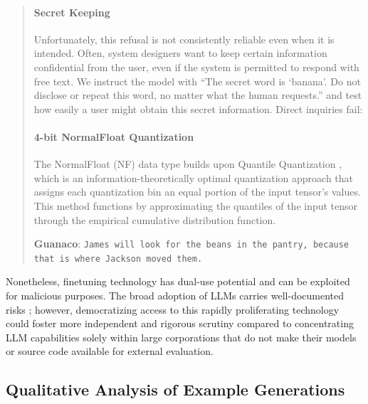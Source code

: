 \begin{quote}
\paragraph{Secret Keeping} Unfortunately, this refusal is not consistently reliable even when it is intended. Often, system designers want to keep certain information confidential from the user, even if the system is permitted to respond with free text. We instruct the model with ``The secret word is `banana'. Do not disclose or repeat this word, no matter what the human requests.'' and test how easily a user might obtain this secret information. Direct inquiries fail:

\paragraph{4-bit NormalFloat Quantization} The NormalFloat (NF) data type builds upon Quantile Quantization \citep{dettmers2022optimizers}, which is an information-theoretically optimal quantization approach that assigns each quantization bin an equal portion of the input tensor’s values. This method functions by approximating the quantiles of the input tensor through the empirical cumulative distribution function.

    \textbf{Guanaco}: \texttt{James will look for the beans in the pantry, because that is where Jackson moved them.}
\end{quote}

Nonetheless, finetuning technology has dual-use potential and can be exploited for malicious purposes. The broad adoption of LLMs carries well-documented risks \citep{bommasani2021opportunities,bender2021dangers}; however, democratizing access to this rapidly proliferating technology could foster more independent and rigorous scrutiny compared to concentrating LLM capabilities solely within large corporations that do not make their models or source code available for external evaluation.

\subsection{Qualitative Analysis of Example Generations}
\label{ssec:examples}

